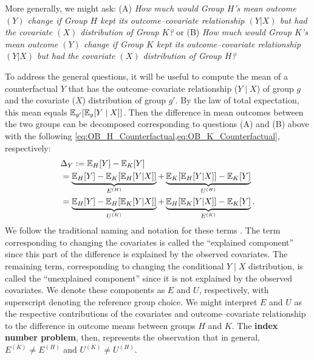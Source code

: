 
More generally, we might ask:
(A) \emph{How much would Group $H$'s mean outcome $(Y)$ change if Group $H$ kept its outcome--covariate relationship $(Y | X)$ but had the covariate $(X)$ distribution of Group $K$?}
or 
(B) \emph{How much would Group $K$'s mean outcome $(Y)$ change if Group $K$ kept its outcome--covariate relationship $(Y | X)$ but had the covariate $(X)$ distribution of Group $H$?}

To address the general questions, it will be useful to compute the mean of a counterfactual $Y$ that has the outcome--covariate relationship ($Y \mid X$) of group $g$ and the covariate ($X$) distribution of group $g'$. By the law of total expectation, this mean equals
$\mathbb{E}_{g'}[\mathbb{E}_g[Y \mid X]]$.
Then the difference in mean outcomes between the two groups can be decomposed corresponding to questions (A) and (B) above with the following
\cref{eq:OB_H_Counterfactual,eq:OB_K_Counterfactual}, respectively: 
%
\begin{align}
\small
& \Delta_Y := \mathbb{E}_H[Y] - \mathbb{E}_K[Y] \nonumber \\
    \label{eq:OB_H_Counterfactual}
    &=\underbrace{\mathbb{E}_H[Y] - \mathbb{E}_K[\mathbb{E}_H[Y | X]] }_{E^{(H)}} 
     + \underbrace{\mathbb{E}_K[\mathbb{E}_H[Y | X]] - \mathbb{E}_K[Y]}_{U^{(H)} } \\
     \label{eq:OB_K_Counterfactual}
     &=\underbrace{\mathbb{E}_H[Y] - \mathbb{E}_H[\mathbb{E}_K[Y | X]] }_{U^{(K)}} 
     + \underbrace{\mathbb{E}_H[\mathbb{E}_K[Y | X]] - \mathbb{E}_K[Y] }_{E^{(K)}}.
\end{align}
%
We follow the traditional naming and notation for these terms \citep{fortinLemieuxFirpo2011}.
The term corresponding to changing the covariates is called the
``explained component'' since this part of the difference is explained by the observed
covariates. The remaining term, corresponding to changing the conditional $Y \mid X$ distribution,
is called the ``unexplained component'' since it is not explained by the observed covariates. We denote these components as $E$ and $U$, respectively, with superscript denoting the reference group choice.
We might interpret $E$ and $U$ as the respective contributions of the covariates and outcome--covariate relationship to the 
difference in outcome means between groups $H$ and $K$. 
The \textbf{index number problem}, then, represents the observation that in general, 
$E^{(K)} \neq E^{(H)}$ and $U^{(K)} \neq U^{(H)}$.

